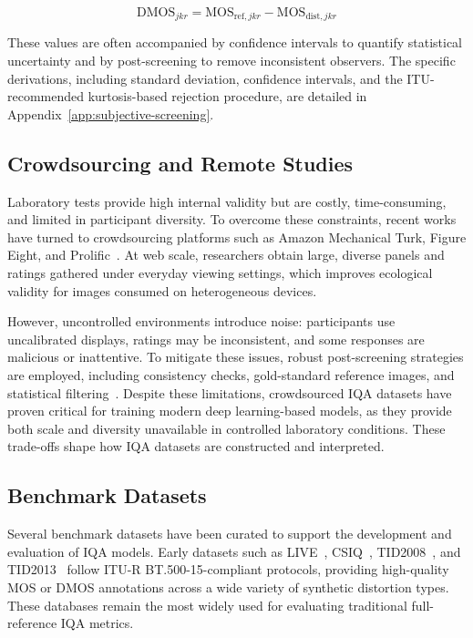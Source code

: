 \begin{equation}
\text{DMOS}_{jkr} = \text{MOS}_{\text{ref},jkr} - \text{MOS}_{\text{dist},jkr}
\end{equation}

These values are often accompanied by confidence intervals to quantify statistical uncertainty and by post-screening to remove inconsistent observers. The specific derivations, including standard deviation, confidence intervals, and the ITU-recommended kurtosis-based rejection procedure, are detailed in Appendix~\ref{app:subjective-screening}.

\subsection{Crowdsourcing and Remote Studies}\label{sec:crowdsourcing}

Laboratory tests provide high internal validity but are costly, time-consuming, and limited in participant diversity. To overcome these constraints, recent works have turned to crowdsourcing platforms such as Amazon Mechanical Turk, Figure Eight, and Prolific~\cite{ghadiyaram2015massive, koniq10k}. At web scale, researchers obtain large, diverse panels and ratings gathered under everyday viewing settings, which improves ecological validity for images consumed on heterogeneous devices.

However, uncontrolled environments introduce noise: participants use uncalibrated displays, ratings may be inconsistent, and some responses are malicious or inattentive. To mitigate these issues, robust post-screening strategies are employed, including consistency checks, gold-standard reference images, and statistical filtering~\cite{ghadiyaram2015massive, koniq10k}. Despite these limitations, crowdsourced \acs{IQA} datasets have proven critical for training modern deep learning-based models, as they provide both scale and diversity unavailable in controlled laboratory conditions. These trade-offs shape how \acs{IQA} datasets are constructed and interpreted.

\subsection{Benchmark Datasets}\label{sec:benchmark_datasets}

Several benchmark datasets have been curated to support the development and evaluation of \acs{IQA} models. Early datasets such as LIVE~\cite{livewebsite, sheikh2005live, sheikh2006live}, CSIQ~\cite{csiq}, TID2008~\cite{tid2008}, and TID2013~\cite{tid2013} follow \acs{ITU-R BT.500-15}-compliant protocols, providing high-quality \acs{MOS} or \acs{DMOS} annotations across a wide variety of synthetic distortion types. These databases remain the most widely used for evaluating traditional full-reference \acs{IQA} metrics.

